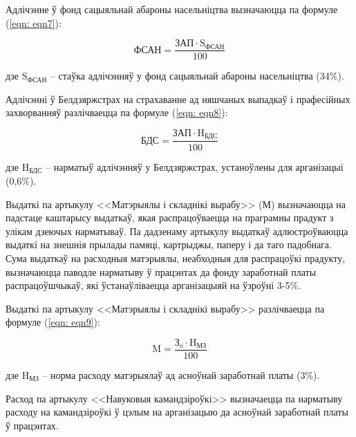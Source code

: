 Адлічэнне ў фонд сацыяльнай абароны насельніцтва вызначаюцца па формуле (\ref{eqn: eqn7}):

\begin{equation}
    \label{eqn: eqn7}
    \text{ФСАН} = \frac{\text{ЗАП} \cdot \text{S}_\text{ФСАН}}{100}
\end{equation}
\begin{Explanation}
    \item[дзе] $\text{S}_\text{ФСАН}$ -- стаўка адлічэнняў у фонд сацыяльнай абароны насельніцтва (34\%).
\end{Explanation}

Адлічэнні ў Белдзяржстрах на страхаванне ад няшчаных выпадкаў і прафесійных захворванняў разлічваецца па формуле (\ref{eqn: eqn8}):

\begin{equation}
    \label{eqn: eqn8}
    \text{БДС} = \frac{\text{ЗАП} \cdot \text{H}_\text{БДС}}{100}
\end{equation}
\begin{Explanation}
    \item[дзе] $\text{H}_\text{БДС}$ -- нарматыў адлічэнняў у Белдзяржстрах, устаноўлены для арганізацыі (0,6\%).
\end{Explanation}

Выдаткі па артыкулу <<Матэрыялы і складнікі вырабу>> (М) вызначаюцца
на падстаце каштарысу выдаткаў, якая распрацоўваецца на праграмны
прадукт з улікам дзеючых нарматываў. Па дадзенаму артыкулу выдаткаў
адлюстроўваюцца выдаткі на знешнія прылады памяці, картрыджы, паперу і да таго падобнага. Сума выдаткаў на расходныя матэрыялы,
неабходныя для распрацоўкі прадукту, вызначаюцца паводле нарматыву
ў працэнтах да фонду заработнай платы распрацоўшчыкаў, які ўстанаўліваецца арганізацыяй на ўзроўні 3-5\%.

Выдаткі па артыкулу <<Матэрыялы і складнікі вырабу>> разлічваецца
па формуле (\ref{eqn: eqn9}):

\begin{equation}
    \label{eqn: eqn9}
    \text{M} = \frac{\text{З}_\text{o} \cdot \text{H}_\text{МЗ}}{100}
\end{equation}
\begin{Explanation}
    \item[дзе] $\text{H}_\text{МЗ}$ -- норма расходу матэрыялаў ад асноўнай заработнай платы (3\%).
\end{Explanation}

Расход па артыкулу <<Навуковыя камандзіроўкі>> вызначаецца па нарматыву расходу на камандзіроўкі ў цэлым на арганізацыю да асноўнай заработнай платы ў працэнтах.

